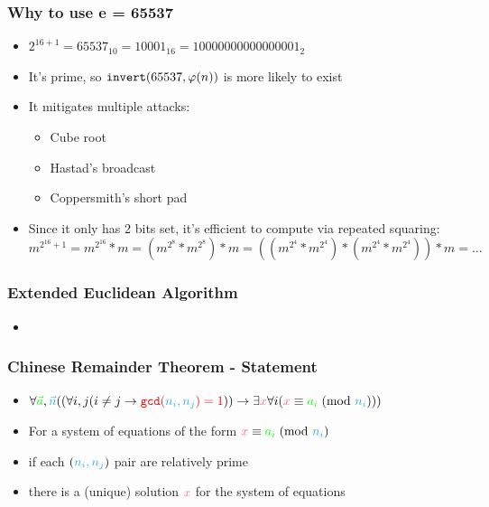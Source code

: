 \documentclass[aspectratio=169]{beamer}
\begin{document}
\begin{frame}[fragile]
\frametitle{Why to use e = 65537}
\begin{itemize}
\item $2^{16+1} = 65537_{10} = 10001_{16} = 10000000000000001_2$
\item It's prime, so $\verb|invert|(65537, \varphi(n))$ is more likely to exist
\item It mitigates multiple attacks:
\begin{itemize}
\item Cube root
\item Hastad's broadcast
\item Coppersmith's short pad
\end{itemize}
\item Since it only has 2 bits set, it's efficient to compute via repeated squaring:
$m^{2^{16}+1} = m^{2^{16}}*m = (m^{2^8}*m^{2^8})*m = ((m^{2^4}*m^{2^4})*(m^{2^4}*m^{2^4}))*m = \hdots$
\end{itemize}
\end{frame}

\begin{frame}[fragile]
\frametitle{Extended Euclidean Algorithm}
\begin{itemize}
\item {}
\end{itemize}
\end{frame}

\begin{frame}[fragile]
\frametitle{Chinese Remainder Theorem - Statement}
\begin{itemize}
\item $\forall {\color{green}\vec{a}}, {\color{cybercyan}\vec{n}}((\forall i,j(i \neq j \rightarrow {\color{red}\verb|gcd|({\color{cybercyan}n_i, n_j}) = 1})) \rightarrow \exists {\color{cyberpink}x} \forall i({\color{cyberpink}x} \equiv {\color{green}a_i}\hspace{1mm}(\text{mod }{\color{cybercyan}n_i})))$
\item For a system of equations of the form ${\color{cyberpink}x} \equiv {\color{green}a_i}\hspace{1mm}(\text{mod }{\color{cybercyan}n_i})$
\item if each $({\color{cybercyan}n_i, n_j})$ pair are {\color{red}relatively prime}
\item there is a (unique) solution ${\color{cyberpink}x}$ for the system of equations
\end{itemize}
\end{frame}
\end{document}
